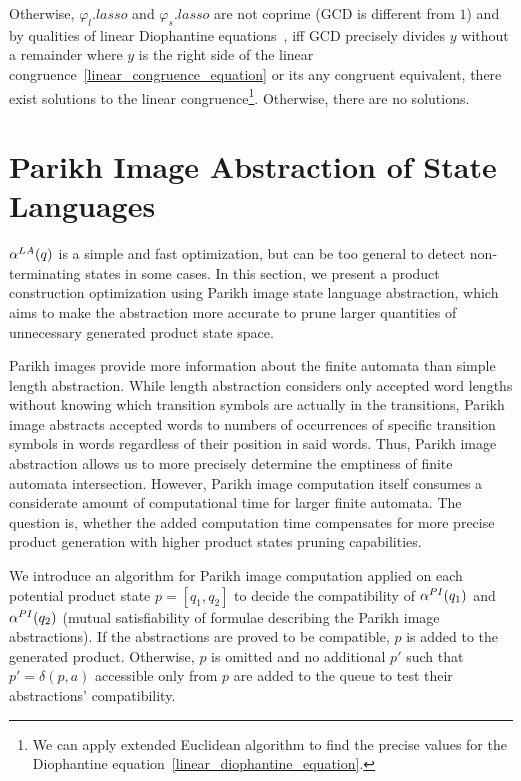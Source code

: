 Otherwise, $\varphi_l.lasso$ and $\varphi_s.lasso$ are not coprime (GCD is different from $1$) and by qualities of linear Diophantine equations~\cite{LinearCongruences}, iff GCD precisely divides $y$ without a remainder where $y$ is the right side of the linear congruence~\ref{linear_congruence_equation} or its any congruent equivalent, there exist solutions to the linear congruence\footnote{We can apply extended Euclidean algorithm to find the precise values for the Diophantine equation~\ref{linear_diophantine_equation}.}. Otherwise, there are no solutions.

\section{Parikh Image Abstraction of State Languages}

$\alpha^{LA}(q)$ is a simple and fast optimization, but can be too general to detect non-terminating states in some cases. In this section, we present a product construction optimization using Parikh image state language abstraction, which aims to make the abstraction more accurate to prune larger quantities of unnecessary generated product state space.

Parikh images provide more information about the finite automata than simple length abstraction. While length abstraction considers only accepted word lengths without knowing which transition symbols are actually in the transitions, Parikh image abstracts accepted words to numbers of occurrences of specific transition symbols in words regardless of their position in said words. Thus, Parikh image abstraction allows us to more precisely determine the emptiness of finite automata intersection. However, Parikh image computation itself consumes a considerate amount of computational time for larger finite automata. The question is, whether the added computation time compensates for more precise product generation with higher product states pruning capabilities.

We introduce an algorithm for Parikh image computation applied on each potential product state $p = [q_1, q_2]$ to decide the compatibility of $\alpha^{PI}(q_1)$ and $\alpha^{PI}(q_2)$ (mutual satisfiability of formulae describing the Parikh image abstractions). If the abstractions are proved to be compatible, $p$ is added to the generated product. Otherwise, $p$ is omitted and no additional $p'$ such that $p' = \delta(p, a)$ accessible only from $p$ are added to the queue to test their abstractions' compatibility.

